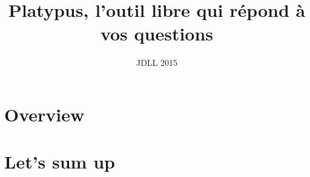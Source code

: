 \documentclass[10pt, compress]{beamer}
\title{Platypus, l'outil libre qui répond à vos questions}
\subtitle{}
\date{JDLL 2015}
\begin{document}
\maketitle



\section{Overview}


\section{Let's sum up}

\end{document}

